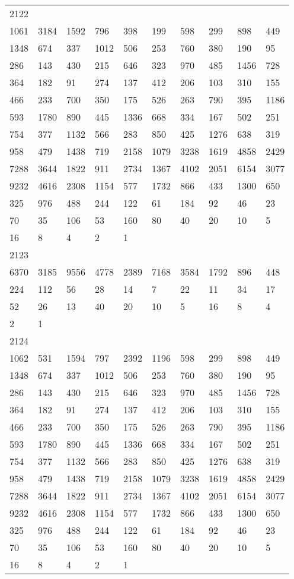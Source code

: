 \begin{longtable}{*{10}{l}}
2122&&&&&&&&&\\
1061& 3184& 1592& 796& 398& 199& 598& 299& 898& 449\\
1348& 674& 337& 1012& 506& 253& 760& 380& 190& 95\\
286& 143& 430& 215& 646& 323& 970& 485& 1456& 728\\
364& 182& 91& 274& 137& 412& 206& 103& 310& 155\\
466& 233& 700& 350& 175& 526& 263& 790& 395& 1186\\
593& 1780& 890& 445& 1336& 668& 334& 167& 502& 251\\
754& 377& 1132& 566& 283& 850& 425& 1276& 638& 319\\
958& 479& 1438& 719& 2158& 1079& 3238& 1619& 4858& 2429\\
7288& 3644& 1822& 911& 2734& 1367& 4102& 2051& 6154& 3077\\
9232& 4616& 2308& 1154& 577& 1732& 866& 433& 1300& 650\\
325& 976& 488& 244& 122& 61& 184& 92& 46& 23\\
70& 35& 106& 53& 160& 80& 40& 20& 10& 5\\
16& 8& 4& 2& 1& \\

2123&&&&&&&&&\\
6370& 3185& 9556& 4778& 2389& 7168& 3584& 1792& 896& 448\\
224& 112& 56& 28& 14& 7& 22& 11& 34& 17\\
52& 26& 13& 40& 20& 10& 5& 16& 8& 4\\
2& 1& \\

2124&&&&&&&&&\\
1062& 531& 1594& 797& 2392& 1196& 598& 299& 898& 449\\
1348& 674& 337& 1012& 506& 253& 760& 380& 190& 95\\
286& 143& 430& 215& 646& 323& 970& 485& 1456& 728\\
364& 182& 91& 274& 137& 412& 206& 103& 310& 155\\
466& 233& 700& 350& 175& 526& 263& 790& 395& 1186\\
593& 1780& 890& 445& 1336& 668& 334& 167& 502& 251\\
754& 377& 1132& 566& 283& 850& 425& 1276& 638& 319\\
958& 479& 1438& 719& 2158& 1079& 3238& 1619& 4858& 2429\\
7288& 3644& 1822& 911& 2734& 1367& 4102& 2051& 6154& 3077\\
9232& 4616& 2308& 1154& 577& 1732& 866& 433& 1300& 650\\
325& 976& 488& 244& 122& 61& 184& 92& 46& 23\\
70& 35& 106& 53& 160& 80& 40& 20& 10& 5\\
16& 8& 4& 2& 1& \\


\end{longtable}
